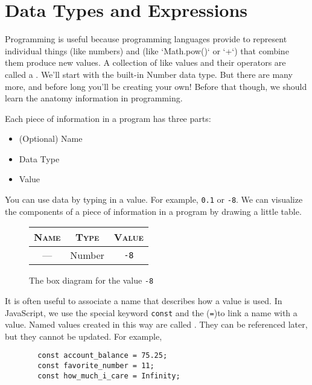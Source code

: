 \documentclass{amsart}
\begin{document}
\section{Data Types and Expressions}
Programming is useful because programming languages provide  to represent individual things (like numbers) and  (like `Math.pow()` or `+`) that combine them produce new values. A collection of like values and their operators are called a . We'll start with the built-in \textsf{Number} data type. But there are many more, and before long you'll be creating your own! Before that though, we should learn the anatomy information in programming.

Each piece of information in a program has three parts:

\begin{itemize}
  \item (Optional) Name
  \item Data Type
  \item Value
\end{itemize}


You can use data by typing in a value. For example, \texttt{0.1} or \texttt{-8}. We can visualize the components of a piece of information in a program by drawing a little table.

\begin{figure}[h]
  \color{cyan}
\begin{tabular}{|c|c|c|}
  \hline
  \textsc{Name} & \textsc{Type} & \textsc{Value}\\
  \hline
  --- & \textsf{Number} & \texttt{-8}\\
  \hline
\end{tabular}
\caption{The box diagram for the value \texttt{-8}}
\end{figure}

It is often useful to associate a name that describes how a value is used. In JavaScript, we use the special keyword {\color{cyan}\texttt{const}} and the  ({\color{cyan}\texttt{=}})to link a name with a value. Named values created in this way are called . They can be referenced later, but they cannot be updated. For example,

\begin{figure}[h]
\begin{lstlisting}
  const account_balance = 75.25;
  const favorite_number = 11;
  const how_much_i_care = Infinity;
\end{lstlisting}
\end{figure}
\end{document}
